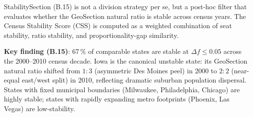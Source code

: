 StabilitySection (B.15) is not a division strategy per se, but a post-hoc
filter that evaluates whether the GeoSection natural ratio is stable across
census years.
The Census Stability Score (CSS) is computed as a weighted combination of
seat stability, ratio stability, and proportionality-gap similarity.

\textbf{Key finding (B.15)}: 67\,\% of comparable states are stable at
$\Delta f \leq 0.05$ across the 2000--2010 census decade.
Iowa is the canonical unstable state: its GeoSection natural ratio shifted from
$1:3$ (asymmetric Des Moines peel) in 2000 to $2:2$ (near-equal east/west split)
in 2010, reflecting dramatic suburban population dispersal.
States with fixed municipal boundaries (Milwaukee, Philadelphia, Chicago) are
highly stable; states with rapidly expanding metro footprints (Phoenix, Las Vegas)
are low-stability.

